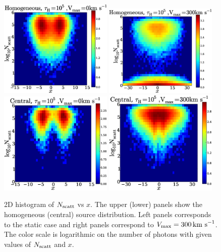 \documentclass{emulateapj}
\newcommand{\kms}{{\ifmmode{{\mathrm{\,km\ s}^{-1}}}\else{\,km~s$^{-1}$}\fi}}
\begin{document}
\begin{figure}
\begin{center}
  \includegraphics[width=0.48\textwidth]{f5_1.eps}
  \includegraphics[width=0.48\textwidth]{f5_2.eps}
  \includegraphics[width=0.48\textwidth]{f5_3.eps}
  \includegraphics[width=0.48\textwidth]{f5_4.eps}    
\end{center}
    \caption{2D histogram of $N_{\rm scatt}$ vs $x$. The upper (lower) panels
      show the homogeneous (central) source distribution. Left panels 
      corresponds to the static case and right panels correspond to
      $V_{\rm max}=300\kms$. The color scale is logarithmic on the
      number of photons with given values of $N_{\rm scatt}$ and
      $x$. \label{fig:Nscatt2D}}   
\end{figure}
\end{document}
